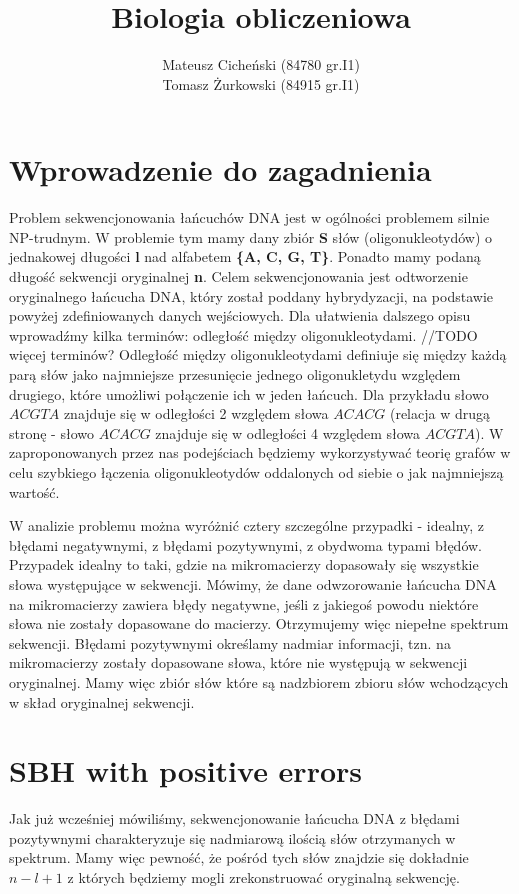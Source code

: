 \documentclass[a4paper]{article}
\title{Biologia obliczeniowa}
\author{Mateusz Cicheński (84780 gr.I1) \\ Tomasz Żurkowski (84915 gr.I1)}
\begin{document}
\maketitle
\tableofcontents

\newpage

\section{Wprowadzenie do zagadnienia}

Problem sekwencjonowania łańcuchów DNA jest w ogólności problemem silnie NP-trudnym. W problemie tym mamy dany zbiór {\bf S} słów (oligonukleotydów) o jednakowej długości {\bf l} nad alfabetem {\bf \{A, C, G, T\}}. Ponadto mamy podaną długość sekwencji oryginalnej {\bf n}. Celem sekwencjonowania jest odtworzenie oryginalnego łańcucha DNA, który został poddany hybrydyzacji, na podstawie powyżej zdefiniowanych danych wejściowych.
Dla ułatwienia dalszego opisu wprowadźmy kilka terminów: odległość między oligonukleotydami.
//TODO więcej terminów?
Odległość między oligonukleotydami definiuje się między każdą parą słów jako najmniejsze przesunięcie jednego oligonukletydu względem drugiego, które umożliwi połączenie ich w jeden łańcuch. Dla przykładu słowo $ACGTA$ znajduje się w odległości 2 względem słowa $ACACG$ (relacja w drugą stronę - słowo $ACACG$ znajduje się w odległości 4 względem słowa $ACGTA$).
W zaproponowanych przez nas podejściach będziemy wykorzystywać teorię grafów w celu szybkiego łączenia oligonukleotydów oddalonych od siebie o jak najmniejszą wartość.

W analizie problemu można wyróżnić cztery szczególne przypadki - idealny, z błędami negatywnymi, z błędami pozytywnymi, z obydwoma typami błędów.
Przypadek idealny to taki, gdzie na mikromacierzy dopasowały się wszystkie słowa występujące w sekwencji.
Mówimy, że dane odwzorowanie łańcucha DNA na mikromacierzy zawiera błędy negatywne, jeśli z jakiegoś powodu niektóre słowa nie zostały dopasowane do macierzy. Otrzymujemy więc niepełne spektrum sekwencji.
Błędami pozytywnymi określamy nadmiar informacji, tzn. na mikromacierzy zostały dopasowane słowa, które nie występują w sekwencji oryginalnej. Mamy więc zbiór słów które są nadzbiorem zbioru słów wchodzących w skład oryginalnej sekwencji.

\section{SBH with positive errors}
Jak już wcześniej mówiliśmy, sekwencjonowanie łańcucha DNA z błędami pozytywnymi charakteryzuje się nadmiarową ilością słów otrzymanych w spektrum. Mamy więc pewność, że pośród tych słów znajdzie się dokładnie $n-l+1$ z których będziemy mogli zrekonstruować oryginalną sekwencję.
\end{document}
